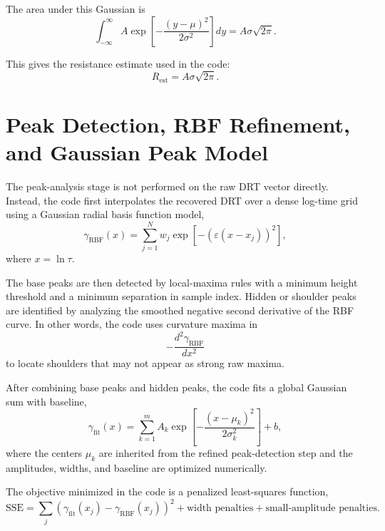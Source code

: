\documentclass[11pt]{article}
\begin{document}
The area under this Gaussian is
\begin{equation}
\int_{-\infty}^{\infty} A \exp\left[-\frac{(y-\mu)^2}{2\sigma^2}\right] dy = A\sigma\sqrt{2\pi}.
\end{equation}

This gives the resistance estimate used in the code:
\begin{equation}
R_{\mathrm{est}} = A\sigma\sqrt{2\pi}.
\end{equation}

\section{Peak Detection, RBF Refinement, and Gaussian Peak Model}

The peak-analysis stage is not performed on the raw DRT vector directly. Instead, the code first interpolates the recovered DRT over a dense log-time grid using a Gaussian radial basis function model,
\begin{equation}
\gamma_{\mathrm{RBF}}(x) = \sum_{j=1}^{N} w_j \exp\!\left[-(\varepsilon(x-x_j))^2\right],
\end{equation}
where $x = \ln\tau$.

The base peaks are then detected by local-maxima rules with a minimum height threshold and a minimum separation in sample index. Hidden or shoulder peaks are identified by analyzing the smoothed negative second derivative of the RBF curve. In other words, the code uses curvature maxima in
\begin{equation}
-\frac{d^2\gamma_{\mathrm{RBF}}}{dx^2}
\end{equation}
to locate shoulders that may not appear as strong raw maxima.

After combining base peaks and hidden peaks, the code fits a global Gaussian sum with baseline,
\begin{equation}
\gamma_{\mathrm{fit}}(x) = \sum_{k=1}^{m} A_k \exp\left[-\frac{(x-\mu_k)^2}{2\sigma_k^2}\right] + b,
\end{equation}
where the centers $\mu_k$ are inherited from the refined peak-detection step and the amplitudes, widths, and baseline are optimized numerically.

The objective minimized in the code is a penalized least-squares function,
\begin{equation}
\mathrm{SSE} = \sum_{j}(\gamma_{\mathrm{fit}}(x_j) - \gamma_{\mathrm{RBF}}(x_j))^2 + \text{width penalties} + \text{small-amplitude penalties}.
\end{equation}
\end{document}
